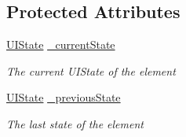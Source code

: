 \subsection*{Protected Attributes}
\begin{DoxyCompactItemize}
\item 
\hyperlink{namespace_midnight_blue_1_1_engine_1_1_u_i_ac8cda7dc9a469f43de5392ebb537ff92}{U\+I\+State} \hyperlink{class_midnight_blue_1_1_engine_1_1_u_i_1_1_u_i_control_element_a8c79233eae8b09a824db91ca73d7f1d0}{\+\_\+current\+State}
\begin{DoxyCompactList}\small\item\em The current U\+I\+State of the element \end{DoxyCompactList}\item 
\hyperlink{namespace_midnight_blue_1_1_engine_1_1_u_i_ac8cda7dc9a469f43de5392ebb537ff92}{U\+I\+State} \hyperlink{class_midnight_blue_1_1_engine_1_1_u_i_1_1_u_i_control_element_a0cfd06330f4957bca2d8fdd1ae6343c1}{\+\_\+previous\+State}
\begin{DoxyCompactList}\small\item\em The last state of the element \end{DoxyCompactList}\end{DoxyCompactItemize}
